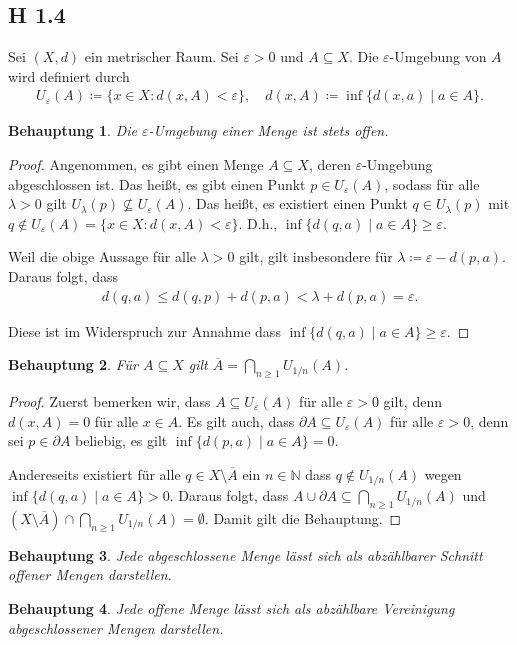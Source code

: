 \documentclass[draft,a5paper]{article}
\newtheorem*{beh}{Behauptung}
\begin{document}
\subsection*{H 1.4}

Sei \((X, d)\) ein metrischer Raum.  Sei \(\varepsilon > 0\) und \(A \subseteq X\).  Die
\(\varepsilon\)-Umgebung von \(A\) wird definiert durch
\begin{align*}
  U_{\varepsilon}(A) \coloneq \{ x \in X \colon d(x, A) < \varepsilon\}, \quad d(x, A) \coloneq \inf \{ d(x, a) \mid a
  \in A\}.
\end{align*}

\begin{beh}
  Die \(\varepsilon\)-Umgebung einer Menge ist stets offen.
\end{beh}

\begin{proof}
  Angenommen, es gibt einen Menge \(A \subseteq X\), deren \(\varepsilon\)-Umgebung
  abgeschlossen ist.  Das heißt, es gibt einen Punkt \(p \in U_{\varepsilon}(A)\),
  sodass für alle \(\lambda > 0\) gilt \(U_{\lambda}(p) \nsubseteq U_{\varepsilon}(A)\).  Das heißt,
  es existiert einen Punkt \(q \in U_{\lambda}(p)\) mit \(q \notin U_{\varepsilon}(A) = \{x \in
  X \colon d(x, A) < \varepsilon\}\).  D.h., \(\inf \{d(q, a) \mid a \in A\} \ge \varepsilon\).

  Weil die obige Aussage für alle \(\lambda > 0\) gilt, gilt insbesondere
  für \(\lambda \coloneq \varepsilon - d(p, a)\).  Daraus folgt, dass
  \begin{align*}
    d(q, a)
    \le d(q, p) + d(p, a)
    < \lambda + d(p, a)
    = \varepsilon.
  \end{align*}

  Diese ist im Widerspruch zur Annahme dass
  \(\inf \{d(q, a) \mid a \in A\} \ge \varepsilon\).
\end{proof}

\begin{beh}
  Für \(A \subseteq X\) gilt \(\overline{A} = \bigcap_{n \ge 1}{U_{1/n}(A)}\).
\end{beh}

\begin{proof}
  Zuerst bemerken wir, dass \(A \subseteq U_{\varepsilon}(A)\) für alle
  \(\varepsilon > 0\) gilt, denn \(d(x, A) = 0\) für alle \(x \in A\).  Es gilt
  auch, dass \(\partial A \subseteq U_{\varepsilon}(A)\) für alle
  \(\varepsilon > 0\), denn sei \(p \in \partial A\) beliebig, es gilt
  \(\inf \{d(p, a) \mid a \in A\} = 0\).

  Andereseits existiert für alle \(q \in X \setminus \overline{A}\) ein
  \(n \in \mathbb{N}\) dass \(q \notin U_{1/n}(A)\) wegen
  \(\inf \{d(q, a) \mid a \in A\} > 0\).  Daraus folgt, dass \(A \cup \partial A \subseteq
  \bigcap_{n \ge 1}{U_{1/n}(A)}\) und \((X \setminus \overline{A}) \cap \bigcap_{n \ge
    1}{U_{1/n}(A)} = \emptyset \).  Damit gilt die Behauptung.
\end{proof}

\begin{beh}
  Jede abgeschlossene Menge lässt sich als abzählbarer Schnitt offener
  Mengen darstellen.
\end{beh}

\begin{beh}
  Jede offene Menge lässt sich als abzählbare Vereinigung
  abgeschlossener Mengen darstellen.
\end{beh}
\end{document}
